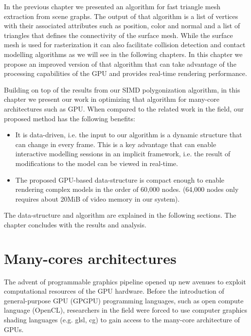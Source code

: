 \label{chapter:GPUDiscretization}
In the previous chapter we presented an algorithm for fast triangle mesh extraction from \blob scene graphs. The output of that 
algorithm is a list of vertices with their associated attributes such as position, color and normal and a list of triangles that
defines the connectivity of the surface mesh. While the surface mesh is used for rasterization it can also facilitate  
collision detection and contact modelling algorithms as we will see in the following chapters.  In this chapter we propose an improved 
version of that algorithm that can take advantage of the processing capabilities of the GPU and provides real-time \blob rendering performance. 

Building on top of the results from our SIMD polygonization algorithm, in this chapter we present our work in optimizing that 
algorithm for many-core architectures such as GPU. When compared to the related work in the field, our proposed method has the following
benefits:

\begin{itemize}
 \item It is data-driven, i.e. the input to our algorithm is a dynamic \blob structure that can change 
 in every frame. This is a key advantage that can enable interactive modelling sessions in an implicit 
 framework, i.e. the result of modifications to the model can be viewed in real-time.

 \item The proposed GPU-based data-structure is compact enough to enable rendering complex \blob models 
 in the order of 60,000 nodes. (64,000 nodes only requires about 20MiB of video memory in our system).
\end{itemize}

The data-structure and algorithm are explained in the following sections. The chapter concludes with 
the results and analysis.

\section{Many-cores architectures}
The advent of programmable graphics pipeline opened up new avenues to exploit computational resources of the
GPU hardware. Before the introduction of general-purpose GPU (GPGPU) programming languages, such as open compute language (OpenCL), 
researchers in the field were forced to use computer graphics shading languages (e.g. glsl, cg) to gain access to 
the many-core architecture of GPUs. 

